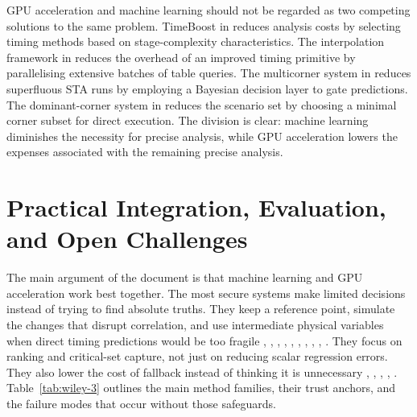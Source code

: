 \documentclass[num-refs]{wiley-article}
\begin{document}
  GPU acceleration and machine learning should not be regarded as two competing solutions to the same problem. TimeBoost in \cite{ref9} reduces analysis costs by selecting timing methods based on stage-complexity characteristics. The interpolation framework in \cite{ref11} reduces the overhead of an improved timing primitive by parallelising extensive batches of table queries. The multicorner system in \cite{ref16} reduces superfluous STA runs by employing a Bayesian decision layer to gate predictions. The dominant-corner system in \cite{ref28} reduces the scenario set by choosing a minimal corner subset for direct execution. The division is clear: machine learning diminishes the necessity for precise analysis, while GPU acceleration lowers the expenses associated with the remaining precise analysis.


  \section{Practical Integration, Evaluation, and Open Challenges}

  The main argument of the document is that machine learning and GPU acceleration work best together. The most secure systems make limited decisions instead of trying to find absolute truths. They keep a reference point, simulate the changes that disrupt correlation, and use intermediate physical variables when direct timing predictions would be too fragile \cite{ref1}, \cite{ref3}, \cite{ref8}, \cite{ref9}, \cite{ref10}, \cite{ref16}, \cite{ref17}, \cite{ref25}, \cite{ref28}, \cite{ref29}. They focus on ranking and critical-set capture, not just on reducing scalar regression errors. They also lower the cost of fallback instead of thinking it is unnecessary \cite{ref21}, \cite{ref22}, \cite{ref23}, \cite{ref37}, \cite{ref40}. Table~\ref{tab:wiley-3} outlines the main method families, their trust anchors, and the failure modes that occur without those safeguards.
\end{document}

